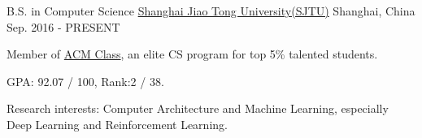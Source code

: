\begin{cventries}
	\cventry
	{B.S. in Computer Science}
	{\href{http://en.sjtu.edu.cn/}{Shanghai Jiao Tong University(SJTU)}}
	{Shanghai, China}
	{Sep. 2016 - PRESENT}
	{
		\begin{cvitems}
			\item {Member of \href{https://acm.sjtu.edu.cn}{ACM Class}, an elite CS program for top 5\% talented students.}
            \item {GPA: 92.07 / 100, Rank:2 / 38.}
            \item {Research interests: Computer Architecture and Machine Learning, especially Deep Learning and Reinforcement Learning.}
		\end{cvitems}
	}
\end{cventries}
